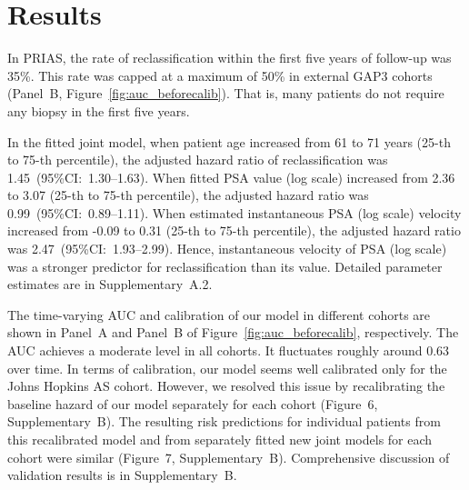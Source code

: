\section{Results}
In PRIAS, the rate of reclassification within the first five years of follow-up was 35\%. This rate was capped at a maximum of 50\% in external GAP3 cohorts (Panel~B, Figure~\ref{fig:auc_beforecalib}). That is, many patients do not require any biopsy in the first five years. 

In the fitted joint model, when patient age increased from 61 to 71 years (25-th to 75-th percentile), the adjusted hazard ratio of reclassification was 1.45~(95\%CI:~1.30--1.63). When fitted PSA value (log scale) increased from 2.36 to 3.07 (25-th to 75-th percentile), the adjusted hazard ratio was 0.99~(95\%CI:~0.89--1.11). When estimated instantaneous PSA (log scale) velocity increased from -0.09 to 0.31 (25-th to 75-th percentile), the adjusted hazard ratio was 2.47~(95\%CI:~1.93--2.99). Hence, instantaneous velocity of PSA (log scale) was a stronger predictor for reclassification than its value. Detailed parameter estimates are in Supplementary~A.2.

The time-varying AUC and calibration of our model in different cohorts are shown in Panel~A and Panel~B of Figure~\ref{fig:auc_beforecalib}, respectively. The AUC achieves a moderate level in all cohorts. It fluctuates roughly around 0.63 over time. In terms of calibration, our model seems well calibrated only for the Johns Hopkins AS cohort. However, we resolved this issue by recalibrating the baseline hazard of our model separately for each cohort (Figure~6, Supplementary~B). The resulting risk predictions for individual patients from this recalibrated model and from separately fitted new joint models for each cohort were similar (Figure~7, Supplementary~B). Comprehensive discussion of validation results is in Supplementary~B.

